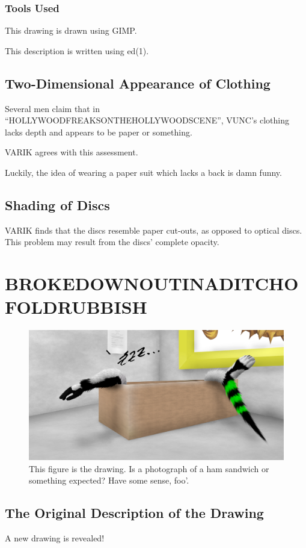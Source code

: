 \documentclass{report}
\begin{document}
\subsection{Tools Used}
This drawing is drawn using GIMP\@.

This description is written using ed(1).
\section{Two-Dimensional Appearance of Clothing}
Several men claim that in ``HOLLYWOODFREAKSONTHEHOLLYWOODSCENE'', VUNC's clothing lacks depth and appears to be paper or something.

VARIK agrees with this assessment.

Luckily, the idea of wearing a paper suit which lacks a back is damn funny.
\section{Shading of Discs}
VARIK finds that the discs resemble paper cut-outs, as opposed to optical discs.  This problem may result from the discs' complete opacity.
\chapter{BROKEDOWNOUTINADITCHOFOLDRUBBISH}
\begin{figure}[ht]
	\centering
	\includegraphics[width=\textwidth]{brokedownoutinaditchofoldrubbish/brokedownoutinaditchofoldrubbish.png}
	\caption[center]{This figure is the drawing.  Is a photograph of a ham sandwich or something expected?  Have some sense, foo'.}
\end{figure}
\section{The Original Description of the Drawing}
A new drawing is revealed!
\end{document}

